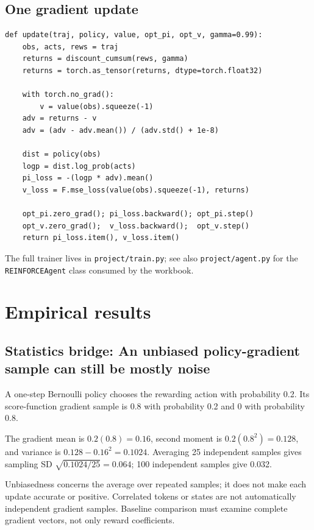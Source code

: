 \documentclass[11pt,oneside]{scrbook}
\begin{document}
\section{One gradient update}

\begin{verbatim}
def update(traj, policy, value, opt_pi, opt_v, gamma=0.99):
    obs, acts, rews = traj
    returns = discount_cumsum(rews, gamma)
    returns = torch.as_tensor(returns, dtype=torch.float32)

    with torch.no_grad():
        v = value(obs).squeeze(-1)
    adv = returns - v
    adv = (adv - adv.mean()) / (adv.std() + 1e-8)

    dist = policy(obs)
    logp = dist.log_prob(acts)
    pi_loss = -(logp * adv).mean()
    v_loss = F.mse_loss(value(obs).squeeze(-1), returns)

    opt_pi.zero_grad(); pi_loss.backward(); opt_pi.step()
    opt_v.zero_grad();  v_loss.backward();  opt_v.step()
    return pi_loss.item(), v_loss.item()
\end{verbatim}

The full trainer lives in \texttt{project/train.py}; see also \texttt{project/agent.py} for the \texttt{REINFORCEAgent} class consumed by the workbook.

\chapter{Empirical results}

\section{Statistics bridge: An unbiased policy-gradient sample can still be mostly noise}
\begin{example}
A one-step Bernoulli policy chooses the rewarding action with probability 0.2. Its score-function gradient sample is 0.8 with probability 0.2 and 0 with probability 0.8.

The gradient mean is $0.2(0.8)=0.16$, second moment is $0.2(0.8^2)=0.128$, and variance is $0.128-0.16^2=0.1024$. Averaging 25 independent samples gives sampling SD $\sqrt{0.1024/25}=0.064$; 100 independent samples give 0.032.
\end{example}
Unbiasedness concerns the average over repeated samples; it does not make each update accurate or positive. Correlated tokens or states are not automatically independent gradient samples. Baseline comparison must examine complete gradient vectors, not only reward coefficients.
\end{document}
